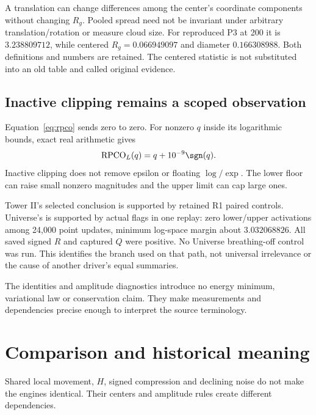 A translation can change differences among the center's coordinate components without changing \(R_g\). Pooled spread need not be invariant under arbitrary translation/rotation or measure cloud size. For reproduced P3 at 200 it is \(3.238809712\), while centered \(R_g=0.066949097\) and diameter \(0.166308988\). Both definitions and numbers are retained. The centered statistic is not substituted into an old table and called original evidence.

\subsection{Inactive clipping remains a scoped observation}
Equation~\eqref{eq:rpco} sends zero to zero. For nonzero \(q\) inside its logarithmic bounds, exact real arithmetic gives
\begin{equation}\label{eq:eps}
\operatorname{RPCO}_L(q)=q+10^{-9}\sgn(q).
\end{equation}
Inactive clipping does not remove epsilon or floating \(\log/\exp\). The lower floor can raise small nonzero magnitudes and the upper limit can cap large ones.

Tower II's selected conclusion is supported by retained R1 paired controls. Universe's is supported by actual flags in one replay: zero lower/upper activations among 24,000 point updates, minimum log-space margin about \(3.032068826\). All saved signed \(R\) and captured \(Q\) were positive. No Universe breathing-off control was run. This identifies the branch used on that path, not universal irrelevance or the cause of another driver's equal summaries.

The identities and amplitude diagnostics introduce no energy minimum, variational law or conservation claim. They make measurements and dependencies precise enough to interpret the source terminology.

\section{Comparison and historical meaning}\label{sec:comparison}
Shared local movement, \(H\), signed compression and declining noise do not make the engines identical. Their centers and amplitude rules create different dependencies.

